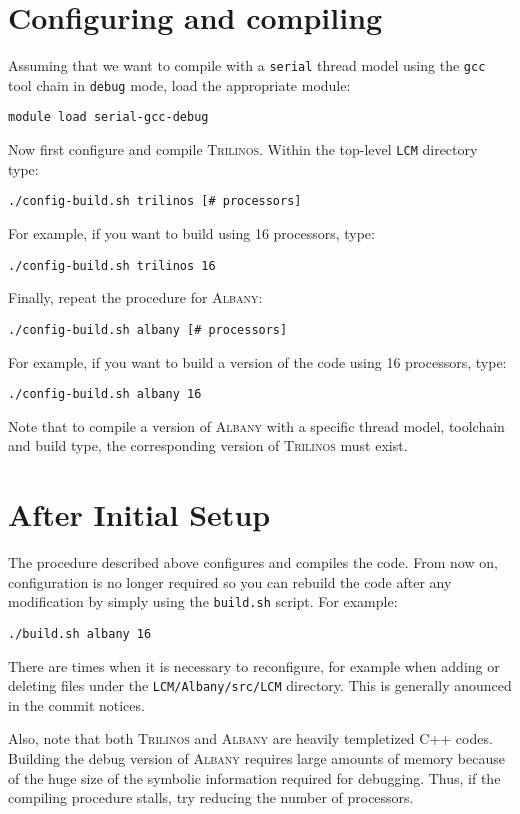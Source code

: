 \documentclass{article}
\newcommand{\trilinos}{\textsc{Trilinos}}
\newcommand{\albany}{\textsc{Albany}}
\begin{document}
\section{Configuring and compiling}

Assuming that we want to compile with a \verb+serial+ thread model
using the \verb+gcc+ tool chain in \verb+debug+ mode, load the
appropriate module:
\begin{verbatim}
module load serial-gcc-debug
\end{verbatim}
Now first configure and compile \trilinos{}. Within the top-level
\verb+LCM+ directory type:
\begin{verbatim}
./config-build.sh trilinos [# processors]
\end{verbatim}
For example, if you want to build using 16 processors, type:
\begin{verbatim}
./config-build.sh trilinos 16
\end{verbatim}
Finally, repeat the procedure for \albany{}:
\begin{verbatim}
./config-build.sh albany [# processors]
\end{verbatim}
For example, if you want to build a version of the code using 16
processors, type:
\begin{verbatim}
./config-build.sh albany 16
\end{verbatim}

Note that to compile a version of \albany{} with a specific thread model,
toolchain and build type, the corresponding version of \trilinos{} must
exist.

\section{After Initial Setup}
The procedure described above configures and compiles the code. From
now on, configuration is no longer required so you can rebuild the
code after any modification by simply using the \verb+build.sh+
script. For example:
\begin{verbatim}
./build.sh albany 16
\end{verbatim}
There are times when it is necessary to reconfigure, for example when
adding or deleting files under the \verb+LCM/Albany/src/LCM+
directory. This is generally anounced in the commit notices.

Also, note that both \trilinos{} and \albany{} are heavily templetized
C++ codes. Building the debug version of \albany{} requires large
amounts of memory because of the huge size of the symbolic information
required for debugging. Thus, if the compiling procedure stalls, try
reducing the number of processors.
\end{document}
